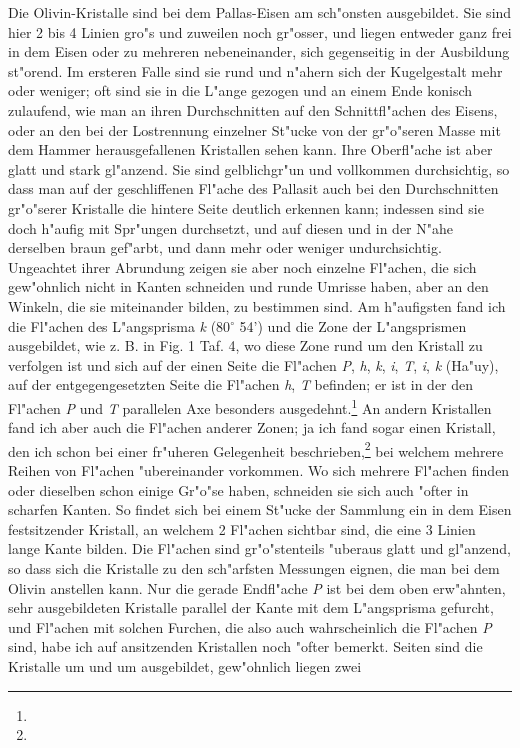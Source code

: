 \documentclass[a4paper, 11pt, oneside]{article}
\begin{document}
Die Olivin-Kristalle sind bei dem Pallas-Eisen am sch"onsten ausgebildet. Sie sind hier 2 bis 4 Linien gro"s und zuweilen noch gr"osser, und liegen entweder ganz frei in dem Eisen oder zu mehreren nebeneinander, sich gegenseitig in der Ausbildung st"orend. Im ersteren Falle sind sie rund und n"ahern sich der Kugelgestalt mehr oder weniger; oft sind sie in die L"ange gezogen und an einem Ende konisch zulaufend, wie man an ihren Durchschnitten auf den Schnittfl"achen des Eisens, oder an den bei der Lostrennung einzelner St"ucke von der gr"o"seren Masse mit dem Hammer herausgefallenen Kristallen sehen kann. Ihre Oberfl"ache ist aber glatt und stark gl"anzend. Sie sind gelblichgr"un und vollkommen durchsichtig, so dass man auf der geschliffenen Fl"ache des Pallasit auch bei den Durchschnitten gr"o"serer Kristalle die hintere Seite deutlich erkennen kann; indessen sind sie doch h"aufig mit Spr"ungen durchsetzt, und auf diesen und in der N"ahe derselben braun gef"arbt, und dann mehr oder weniger undurchsichtig. Ungeachtet ihrer Abrundung zeigen sie aber noch einzelne Fl"achen, die sich gew"ohnlich nicht in Kanten schneiden und runde Umrisse haben, aber an den Winkeln, die sie miteinander bilden, zu bestimmen sind. Am h"aufigsten fand ich die Fl"achen des L"angsprisma \emph{k} (80$^{\circ}$ 54’) und die Zone der L"angsprismen ausgebildet, wie z. B. in Fig. 1 Taf. 4, wo diese Zone rund um den Kristall zu verfolgen ist und sich auf der einen Seite die Fl"achen \emph{P}, \emph{h}, \emph{k}, \emph{i}, \emph{T}, \emph{i}, \emph{k} (Ha"uy), auf der entgegengesetzten Seite die Fl"achen \emph{h}, \emph{T} befinden; er ist in der den Fl"achen \emph{P} und \emph{T} parallelen Axe besonders ausgedehnt.\footnote{} An andern Kristallen fand ich aber auch die Fl"achen anderer Zonen; ja ich fand sogar einen Kristall, den ich schon bei einer fr"uheren Gelegenheit beschrieben,\footnote{} bei welchem mehrere Reihen von Fl"achen "ubereinander vorkommen. Wo sich mehrere Fl"achen finden oder dieselben schon einige Gr"o"se haben, schneiden sie sich auch "ofter in scharfen Kanten. So findet sich bei einem St"ucke der Sammlung ein in dem Eisen festsitzender Kristall, an welchem 2 Fl"achen sichtbar sind, die eine 3 Linien lange Kante bilden. Die Fl"achen sind gr"o"stenteils "uberaus glatt und gl"anzend, so dass sich die Kristalle zu den sch"arfsten Messungen eignen, die man bei dem Olivin anstellen kann. Nur die gerade Endfl"ache \emph{P} ist bei dem oben erw"ahnten, sehr ausgebildeten Kristalle parallel der Kante mit dem L"angsprisma gefurcht, und Fl"achen mit solchen Furchen, die also auch wahrscheinlich die Fl"achen \emph{P} sind, habe ich auf ansitzenden Kristallen noch "ofter bemerkt. Seiten sind die Kristalle um und um ausgebildet, gew"ohnlich liegen zwei 
\end{document}
